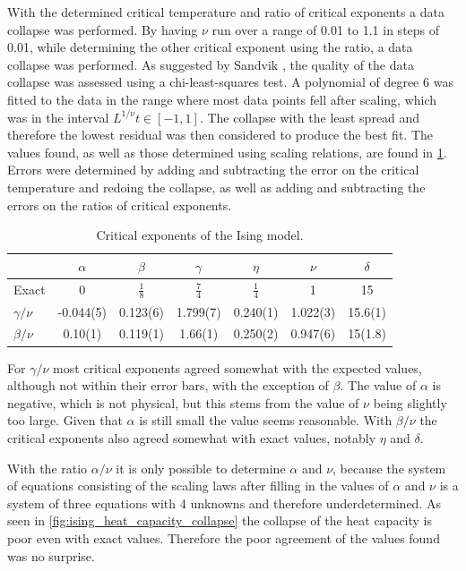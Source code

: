 \documentclass[11pt, a4paper]{report} %
\begin{document}
With the determined critical temperature and ratio of critical exponents a data collapse was performed.
By having \(\nu\) run over a range of 0.01 to 1.1 in steps of 0.01, while determining the other critical exponent using the ratio, a data collapse was performed.
As suggested by Sandvik \cite{sandvik:2011}, the quality of the data collapse was assessed using a chi-least-squares test.
A polynomial of degree 6 was fitted to the data in the range where most data points fell after scaling, which was in the interval \(L^{1/\nu}t \in [-1, 1]\).
The collapse with the least spread and therefore the lowest residual was then considered to produce the best fit.
The values found, as well as those determined using scaling relations, are found in \cref{tab:ising_critical_exponents}.
Errors were determined by adding and subtracting the error on the critical temperature and redoing the collapse, as well as adding and subtracting the errors on the ratios of critical exponents.

\begin{table}[htb]
	\centering
	\renewcommand{\arraystretch}{1.5}
	\begin{tabular}{l | c c c c c c}
		\hline
		& \(\alpha\) & \(\beta\) & \(\gamma\) & \(\eta\) & \(\nu\) & \(\delta\) \\\hline
		Exact & 0 & \(\frac{1}{8}\) & \(\frac{7}{4}\) & \(\frac{1}{4}\) & 1 & 15 \\
		\(\gamma/\nu\) & -0.044(5) & 0.123(6) & 1.799(7) & 0.240(1) & 1.022(3) & 15.6(1) \\
		\(\beta/\nu\) & 0.10(1) & 0.119(1) & 1.66(1) & 0.250(2) & 0.947(6) & 15(1.8)\\\hline
	\end{tabular}
	\caption{Critical exponents of the Ising model.}
	\label{tab:ising_critical_exponents}
\end{table}

For \(\gamma/\nu\) most critical exponents agreed somewhat with the expected values, although not within their error bars, with the exception of \(\beta\).
The value of \(\alpha\) is negative, which is not physical, but this stems from the value of \(\nu\) being slightly too large.
Given that \(\alpha\) is still small the value seems reasonable.
With \(\beta/\nu\) the critical exponents also agreed somewhat with exact values, notably \(\eta\) and \(\delta\).

With the ratio \(\alpha / \nu\) it is only possible to determine \(\alpha\) and \(\nu\), because the system of equations consisting of the scaling laws after filling in the values of \(\alpha\) and \(\nu\) is a system of three equations with 4 unknowns and therefore underdetermined.
As seen in \cref{fig:ising_heat_capacity_collapse} the collapse of the heat capacity is poor even with exact values.
Therefore the poor agreement of the values found was no surprise.
\end{document}
